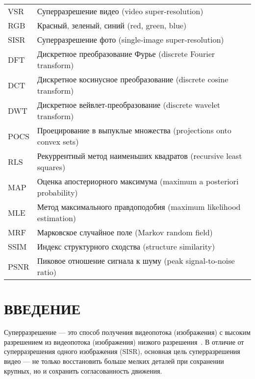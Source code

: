\documentclass{bmstu}
\begin{document}
\begin{table}[H]
\begin{tabular}{p{3cm}p{13.5cm}}
VSR & Суперразрешение видео (video super-resolution)
\tabularnewline
RGB & Красный, зеленый, синий (red, green, blue)
\tabularnewline
SISR & Суперразрешение фото (single-image super-resolution)
\tabularnewline
DFT & Дискретное преобразование Фурье (discrete Fourier transform)
\tabularnewline
DCT & Дискретное косинусное преобразование (discrete cosine transform)
\tabularnewline
DWT & Дискретное вейвлет-преобразование (discrete wavelet transform)
\tabularnewline
POCS & Проецирование в выпуклые множества (projections onto convex sets)
\tabularnewline
RLS & Рекуррентный метод наименьших квадратов (recursive least squares)
\tabularnewline
MAP & Оценка апостериорного максимума (maximum a posteriori probability)
\tabularnewline
MLE & Метод максимального правдоподобия (maximum likelihood estimation)
\tabularnewline
MRF & Марковское случайное поле (Markov random field)
\tabularnewline
SSIM & Индекс структурного сходства (structure similarity)
\tabularnewline
PSNR & Пиковое отношение сигнала к шуму (peak signal-to-noise ratio)
\tabularnewline
\end{tabular}
\end{table}

{\centering \chapter*{ВВЕДЕНИЕ}}

Суперразрешение --- это способ получения видеопотока (изображения) с высоким разрешением из видеопотока (изображения) низкого разрешения~\cite{Park2003}. 
В отличие от суперразрешения одного изображения (SISR), основная цель суперразрешения видео --- не только восстановить больше мелких деталей при сохранении крупных, но и сохранить согласованность движения.
\end{document}
